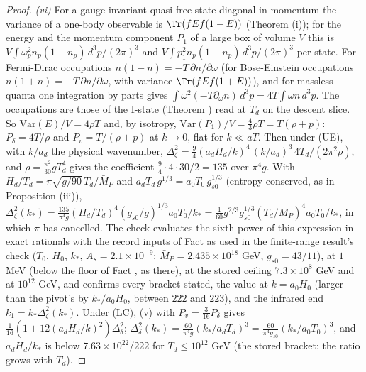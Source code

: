 \begin{proof}
\emph{(vi)} For a gauge-invariant quasi-free state diagonal in momentum the variance of a one-body observable is $\Tr(fEf(1 - E))$ (Theorem (i)); for the energy and the momentum component $P_{1}$ of a large box of volume $V$ this is $V\int\omega_{p}^{2}n_{p}(1 - n_{p})\,d^{3}p/(2\pi)^{3}$ and $V\int p_{1}^{2}n_{p}(1 - n_{p})\,d^{3}p/(2\pi)^{3}$ per state. For Fermi-Dirac occupations $n(1 - n) = -T\,\partial n/\partial\omega$ (for Bose-Einstein occupations $n(1 + n) = -T\,\partial n/\partial\omega$, with variance $\Tr(fEf(1 + E))$), and for massless quanta one integration by parts gives $\int\omega^{2}(-T\partial_{\omega}n)\,d^{3}p = 4T\int\omega n\,d^{3}p$. The occupations are those of the I-state (Theorem ) read at $T_{d}$ on the descent slice. So $\mathrm{Var}(E)/V = 4\rho T$ and, by isotropy, $\mathrm{Var}(P_{1})/V = \tfrac43\rho T = T(\rho + p)$: $P_{\delta} = 4T/\rho$ and $P_{v} = T/(\rho + p)$ at $k \to 0$, flat for $k \ll aT$. Then under (UE), with $k/a_{d}$ the physical wavenumber, $\Delta^{2}_{\zeta} = \tfrac94(a_{d}H_{d}/k)^{4}\,(k/a_{d})^{3}\,4T_{d}/(2\pi^{2}\rho)$, and $\rho = \tfrac{\pi^{2}}{30}gT_{d}^{4}$ gives the coefficient $\tfrac94\cdot4\cdot30/2 = 135$ over $\pi^{4}g$. With $H_{d}/T_{d} = \pi\sqrt{g/90}\,T_{d}/\bar M_{P}$ and $a_{d}T_{d}\,g^{1/3} = a_{0}T_{0}\,g_{s0}^{1/3}$ (entropy conserved, as in Proposition (iii)), $\Delta^{2}_{\zeta}(k_{*}) = \tfrac{135}{\pi^{4}g}(H_{d}/T_{d})^{4}(g_{s0}/g)^{1/3}a_{0}T_{0}/k_{*} = \tfrac{1}{60}g^{2/3}g_{s0}^{1/3}(T_{d}/\bar M_{P})^{4}a_{0}T_{0}/k_{*}$, in which $\pi$ has cancelled. The check evaluates the sixth power of this expression in exact rationals with the record inputs of Fact  as used in the finite-range result's check ($T_{0}$, $H_{0}$, $k_{*}$, $A_{s} = 2.1 \times 10^{-9}$; $\bar M_{P} = 2.435 \times 10^{18}$ GeV, $g_{s0} = 43/11$), at $1$ MeV (below the floor of Fact , as there), at the stored ceiling $7.3 \times 10^{8}$ GeV and at $10^{12}$ GeV, and confirms every bracket stated, the value at $k = a_{0}H_{0}$ (larger than the pivot's by $k_{*}/a_{0}H_{0}$, between $222$ and $223$), and the infrared end $k_{1} = k_{*}\Delta^{2}_{\zeta}(k_{*})$. Under (LC), (v) with $P_{v} = \tfrac{3}{16}P_{\delta}$ gives $\tfrac1{16}(1 + 12(a_{d}H_{d}/k)^{2})\Delta^{2}_{\delta}$; $\Delta^{2}_{\delta}(k_{*}) = \tfrac{60}{\pi^{4}g}(k_{*}/a_{d}T_{d})^{3} = \tfrac{60}{\pi^{4}g_{s0}}(k_{*}/a_{0}T_{0})^{3}$, and $a_{d}H_{d}/k_{*}$ is below $7.63 \times 10^{22}/222$ for $T_{d} \le 10^{12}$ GeV (the stored bracket; the ratio grows with $T_{d}$).


\end{proof}
